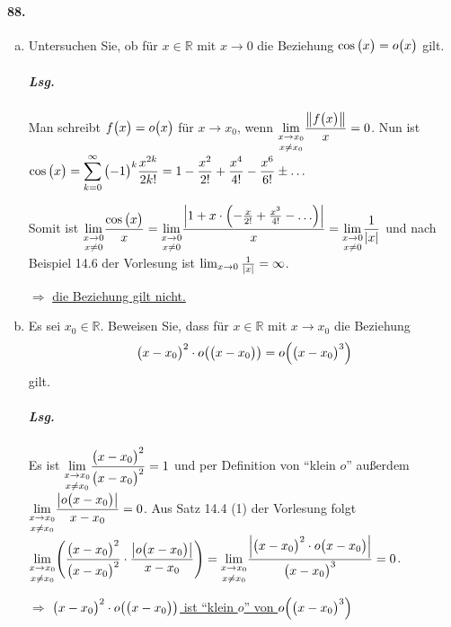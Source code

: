 \documentclass{scrreprt}
\begin{document}
\paragraph{88.}
\begin{enumerate}[(a)]
\item Untersuchen Sie, ob für $x \in \mathbb{R}$ mit $x \to 0$ die Beziehung
  $\cos\qty\big(x) = o\qty\big(x)$ gilt.
  \subparagraph{Lsg.} Man schreibt $f\qty\big(x) = o\qty\big(x)$ für $x \to x_0$,
  wenn $\displaystyle \underset{x \ne x_0}{\lim_{x \to x_0}}
  \frac{\norm{f\qty\big(x)}}{x} = 0$.
  Nun ist $\displaystyle \cos\qty\big(x) =
  \sum_{k = 0}^{\infty} \qty\big(-1)^k \frac{x^{2k}}{2k!} =
  1 - \frac{x^2}{2!} + \frac{x^4}{4!} - \frac{x^6}{6!} \pm \ldots$

  Somit ist $\displaystyle \underset{x \ne 0}{\lim_{x \to 0}}
  \frac{\cos\qty\big(x)}{x} = \underset{x \ne 0}{\lim_{x \to 0}}
  \frac{\abs{1 + x \cdot \qty(-\frac{x}{2!} + \frac{x^3}{4!} - \ldots)}}{x}
  = \underset{x \ne 0}{\lim_{x \to 0}} \frac{1}{\abs{x}}$
  und nach Beispiel 14.6 der Vorlesung ist
  $\lim_{x \to 0} \frac{1}{\abs{x}} = \infty$.

  $\Rightarrow$ \underline{die Beziehung gilt nicht.}

\item Es sei $x_0 \in \mathbb{R}$.
  Beweisen Sie, dass für $x \in \mathbb{R}$ mit $x \to x_0$ die Beziehung
  \[
    \qty\big(x - x_0)^2 \cdot o\qty\big(\qty\big(x - x_0)) =
    o\qty\Big(\qty\big(x - x_0)^3)
  \]
  gilt.
  \subparagraph{Lsg.} Es ist
  $\displaystyle \underset{x \ne x_0}{\lim_{x \to x_0}}
  \frac{\qty\big(x - x_0)^2}{\qty\big(x - x_0)^2} = 1$
  und per Definition von ``klein $o$'' außerdem
  $\displaystyle \underset{x \ne x_0}{\lim_{x \to x_0}}
  \frac{\abs{o\qty\big(x - x_0)}}{x - x_0} = 0$.
  Aus Satz 14.4 (1) der Vorlesung folgt
  $\displaystyle \underset{x \ne x_0}{\lim_{x \to x_0}}
  \qty(\frac{\qty\big(x - x_0)^2}{\qty\big(x - x_0)^2} \cdot
  \frac{\abs{o\qty\big(x - x_0)}}{x - x_0}) =
  \underset{x \ne x_0}{\lim_{x \to x_0}}
  \frac{\abs{\qty\big(x - x_0)^2 \cdot o\qty\big(x - x_0)}}{\qty\big(x - x_0)^3}
  = 0$.

  $\Rightarrow$ \underline{
    $\qty\big(x - x_0)^2 \cdot o\qty\big(\qty\big(x - x_0))$ ist ``klein $o$''
    von $o\qty\Big(\qty\big(x - x_0)^3)$}
\end{enumerate}
\end{document}
